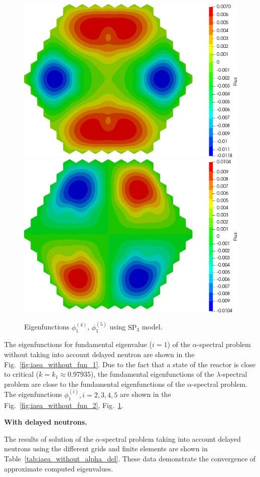 \documentclass[authoryear]{elsarticle}
\begin{document}
\begin{figure}[h]
\begin{center}
	\includegraphics[width=0.49\linewidth]{iaea_without/alpha_sp3_u1_4_without.png}
	\includegraphics[width=0.49\linewidth]{iaea_without/alpha_sp3_u1_5_without.png}\\
	\caption{Eigenfunctions $\phi_1^{(4)}$, $\phi_1^{(5)}$ using $\mathrm{SP_3}$ model.}
	\label{fig:iaea_without_fun_3}
\end{center}
\end{figure}

The eigenfunctions for fundamental eigenvalue ($i=1$) of the $\alpha$-spectral problem without taking into account delayed neutron are shown in the Fig.~\ref{fig:iaea_without_fun_1}. 
Due to the fact that a state of the reactor is close to critical ($k=k_1\approx 0.97935$), the fundamental eigenfunctions of the $\lambda$-spectral problem are close to the fundamental eigenfunctions of the $\alpha$-spectral problem.
The eigenfunctions $\phi_1^{(i)}, i=2,3,4,5$ are shown in the Fig.~\ref{fig:iaea_without_fun_2}, Fig.~\ref{fig:iaea_without_fun_3}.

\textbf{With delayed neutrons.}

The results of solution of the $\alpha$-spectral problem taking into account delayed neutrons using the different grids and finite elements are shown in Table~\ref{tab:iaea_without_alpha_del}.
These data demonstrate the convergence of approximate computed eigenvalues.
\end{document}
